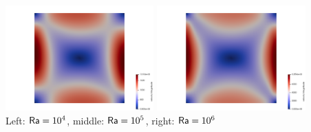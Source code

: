 \begin{center}
\includegraphics[width=5.7cm]{python_codes/fieldstone_110/results_BA/aspect/vel_Ra1e5}
\includegraphics[width=5.7cm]{python_codes/fieldstone_110/results_BA/aspect/vel_Ra1e6}\\
{\captionfont Left: ${\mathsf{Ra}}=10^4$, middle: ${\mathsf{Ra}}=10^5$, right: ${\mathsf{Ra}}=10^6$} 
\end{center}

\vspace{5mm}

